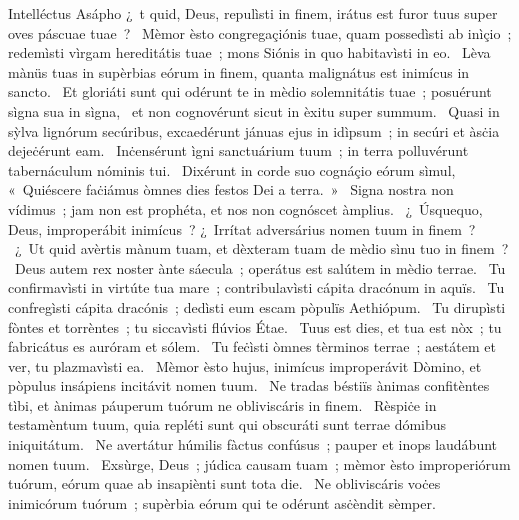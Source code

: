 { Intelléctus Asápho}
{%
¿~t quid, Deus, repulìsti in finem, irátus est furor tuus super oves páscuae tuae~? 
~Mèmor èsto congregaçiónis tuae, quam possedìsti ab inìçio~; redemìsti vìrgam hereditátis tuae~; mons Siónis in quo habitavìsti in eo. 
~Lèva mànüs tuas in supèrbias eórum in finem, quanta malignátus est inimícus in sancto. 
~Et gloriáti sunt qui odérunt te in mèdio solemnitátis tuae~; posuérunt sìgna sua in sìgna, 
~et non cognovérunt sicut in èxitu super summum. 
~Quasi in sỳlva lignórum secúribus, excaedérunt jánuas ejus in idìpsum~; in secúri et àsċia dejeċérunt eam. 
~Inċensérunt ìgni sanctuárium tuum~; in terra polluvérunt tabernáculum nóminis tui. 
~Dixérunt in corde suo cognáçio eórum sìmul, «~Quiéscere faċiámus òmnes dies festos Dei a terra.~»
~Signa nostra non vídimus~; jam non est prophéta, et nos non cognóscet àmplius. 
~¿~Úsquequo, Deus, improperábit inimícus~? ¿~Irrítat adversárius nomen tuum in finem~? 
~¿~Ut quid avèrtis mànum tuam, et dèxteram tuam de mèdio sìnu tuo in finem~? 
~Deus autem rex noster ànte sáecula~; operátus est salútem in mèdio terrae. 
~Tu confirmavìsti in virtúte tua mare~; contribulavìsti cápita dracónum in aquïs. 
~Tu confregìsti cápita dracónis~; dedìsti eum escam pòpulïs Aethiópum. 
~Tu dirupìsti fòntes et torrèntes~; tu siccavìsti flúvios Étae. 
~Tuus est dies, et tua est nòx~; tu fabricátus es auróram et sólem. 
~Tu feċìsti òmnes tèrminos terrae~; aestátem et ver, tu plazmavìsti ea. 
~Mèmor èsto hujus, inimícus improperávit Dòmino, et pòpulus insápiens incitávit nomen tuum. 
~Ne tradas béstiïs ànimas confitèntes tìbi, et ànimas páuperum tuórum ne obliviscáris in finem. 
~Rèspiċe in testamèntum tuum, quia repléti sunt qui obscuráti sunt terrae dómibus iniquitátum. 
~Ne avertátur húmilis fàctus confúsus~; pauper et inops laudábunt nomen tuum. 
~Exsùrge, Deus~; júdica causam tuam~; mèmor èsto improperiórum tuórum, eórum quae ab insapiènti sunt tota die. 
~Ne obliviscáris voċes inimicórum tuórum~; supèrbia eórum qui te odérunt asċèndit sèmper. 
}
